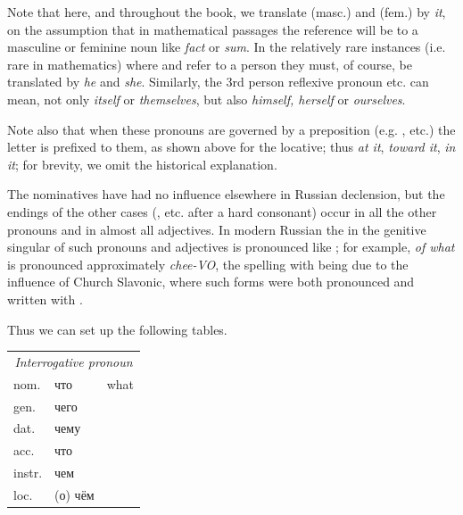 Note that here, and throughout the book, we translate  (masc.) and  (fem.) by \emph{it}, on the assumption that in mathematical passages the reference will be to a masculine or feminine noun like  \emph{fact} or  \emph{sum}. In the relatively rare instances (i.e. rare in mathematics) where  and  refer to a person they must, of course, be translated by \emph{he} and \emph{she}. Similarly, the 3rd person reflexive pronoun  etc. can mean, not only \emph{itself} or \emph{themselves}, but also \emph{himself, herself} or \emph{ourselves}.

Note also that when these pronouns are governed by a preposition (e.g. , etc.) the letter  is prefixed to them, as shown above for the locative; thus  \emph{at it},  \emph{toward it},  \emph{in it}; for brevity, we omit the historical explanation.

The nominatives  have had no influence elsewhere in Russian declension, but the endings of the other cases  (, etc. after a hard consonant) occur in all the other pronouns and in almost all adjectives. In modern Russian the  in the genitive singular of such pronouns and adjectives is pronounced like ; for example,  \emph{of what} is pronounced approximately \emph{chee-VO}, the spelling with  being due to the influence of Church Slavonic, where such forms were both pronounced and written with .

Thus we can set up the following tables.

\begin{center}
\small
\begin{tabular}{@{}l >{\cyrillicfont}l l@{}}
\multicolumn{3}{c}{\textit{Interrogative pronoun}}\\
nom. & что & what\\
gen. & чего & \\
dat. & чему & \\
acc. & что & \\
instr. & чем & \\
loc. & (о) чём & \\
\end{tabular}
\end{center}


